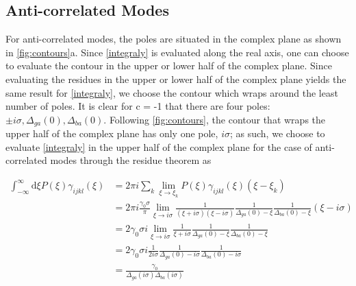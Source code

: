 \documentclass[aip, jcp, reprint, onecolumn, nofootinbib]{revtex4-2}
\begin{document}
\subsection{Anti-correlated Modes}
For anti-correlated modes, the poles are situated in the complex plane as shown in \autoref{fig:contours}a.
Since \autoref{integraly} is evaluated along the real axis, one can choose to evaluate the contour in the upper or lower half of the complex plane.
Since evaluating the residues in the upper or lower half of the complex plane yields the same result for \autoref{integraly}, we choose the contour which wraps around the least number of poles.
It is clear for c = -1 that there are four poles: $\pm i \sigma, \Delta_{ga}(0), \Delta_{ba}(0)$. 
Following \autoref{fig:contours}, the contour that wraps the upper half of the complex plane has only one pole, $i \sigma$; as such, we choose to evaluate \autoref{integraly} in the upper half of the complex plane for the case of anti-correlated modes through the residue theorem as
\begin{widetext}
	\begin{equation}
		\begin{split}
			\int_{-\infty}^\infty \mathrm{d}\xi P(\xi) \gamma_{ijkl}(\xi) &= 2\pi i \sum_k \lim_{\xi \rightarrow \xi_k} P(\xi) \gamma_{ijkl}(\xi) (\xi - \xi_k)\\
			&= 2\pi i \frac{\gamma_0 \sigma}{\pi} \lim_{\xi \rightarrow i\sigma} \frac{1}{(\xi + i\sigma)(\xi - i\sigma)} \frac{1}{\Delta_{ga}(0) - \xi} \frac{1}{\Delta_{ba}(0) - \xi} (\xi - i \sigma)\\
			&= 2 \gamma_0 \sigma i \lim_{\xi \rightarrow i\sigma} \frac{1}{\xi + i\sigma} \frac{1}{\Delta_{ga}(0) - \xi} \frac{1}{\Delta_{ba}(0) - \xi}\\
			&= 2\gamma_0 \sigma i \frac{1}{2i\sigma} \frac{1}{\Delta_{ga}(0) - i\sigma} \frac{1}{\Delta_{ba}(0) - i\sigma}\\
			&= \frac{\gamma_0}{\Delta_{ga}(i\sigma)\Delta_{ba}(i \sigma)}\\
		\end{split}
	\end{equation}
\end{widetext}
\end{document}
